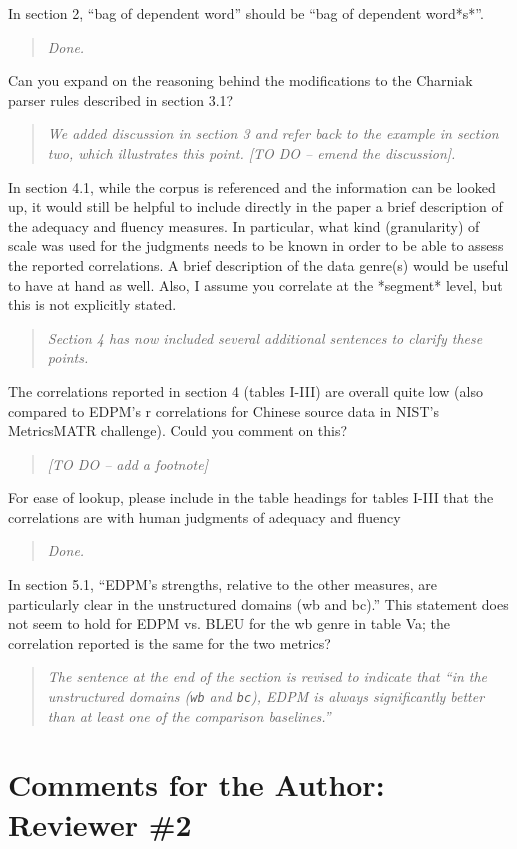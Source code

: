 \documentclass[letterpaper,12pt]{article}
\newenvironment{response}
{\begin{quotation} \it}
  {\end{quotation}}
\begin{document}
In section 2, ``bag of dependent word'' should be ``bag of dependent
word*s*''.
\begin{response}
  Done.
\end{response}
Can you expand on the reasoning behind the modifications to the
Charniak parser rules described in section 3.1?
\begin{response}
  We added discussion in section 3 and refer back to the example in
  section two, which illustrates this point. [TO DO -- emend the discussion].
\end{response}
In section 4.1, while the corpus is referenced and the information can
be looked up, it would still be helpful to include directly in the
paper a brief description of the adequacy and fluency measures.  In
particular, what kind (granularity) of scale was used for the
judgments needs to be known in order to be able to assess the reported
correlations.  A brief description of the data genre(s) would be
useful to have at hand as well.  Also, I assume you correlate at the
*segment* level, but this is not explicitly stated.
\begin{response}
  Section 4 has now included several additional sentences to clarify
  these points.
\end{response}
The correlations reported in section 4 (tables I-III) are overall
quite low (also compared to EDPM's r correlations for Chinese source
data in NIST's MetricsMATR challenge).  Could you comment on this?
\begin{response}
 [TO DO -- add a footnote]
\end{response}
For ease of lookup, please include in the table headings for tables
I-III that the correlations are with human judgments of adequacy and
fluency
\begin{response}
  Done.
\end{response}

In section 5.1, ``EDPM's strengths, relative to the other measures, are
particularly clear in the unstructured domains (wb and bc).''  This
statement does not seem to hold for EDPM vs. BLEU for the wb genre in
table Va; the correlation reported is the same for the two metrics?
\begin{response}
  The sentence at the end of the section is revised to indicate that
  ``in the unstructured domains (\texttt{wb} and \texttt{bc}), EDPM is
  always significantly better than at least one of the comparison
  baselines.''
\end{response}

\section{Comments for the Author: Reviewer \#2}
\label{sec:reviewer2}
\end{document}
